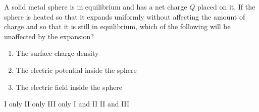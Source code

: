 \begin{questions}\setcounter{question}{32}\question
A solid metal sphere is in equilibrium and has a net charge $Q$ placed on it. If the sphere is heated so that it expands uniformly without affecting the amount of charge and so that it is still in equilibrium, which of the following will be unaffected by the expansion?
\begin{enumerate}
    \item The surface charge density
    \item The electric potential inside the sphere
    \item The electric field inside the sphere
\end{enumerate}

\begin{oneparchoices}
\choice I only
\choice II only
\choice III only
\choice I and II
\choice II and III
\end{oneparchoices}\end{questions}

